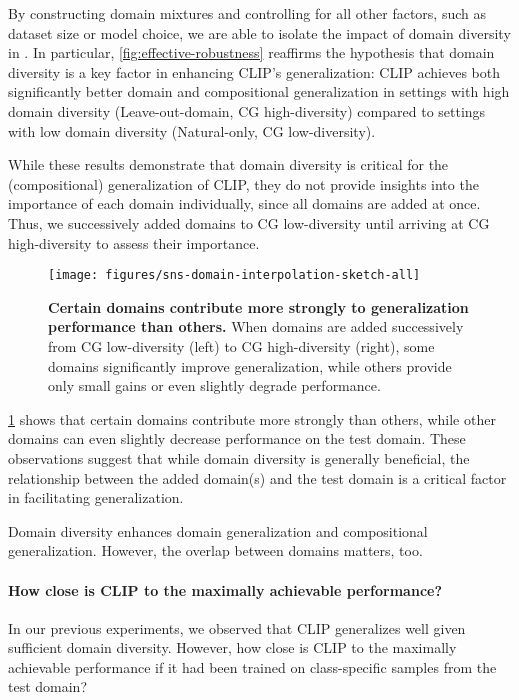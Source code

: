 By constructing domain mixtures and controlling for all other factors, such as dataset size or model choice, we are able to isolate the impact of domain diversity in . In particular, \cref{fig:effective-robustness} reaffirms the hypothesis that domain diversity is a key factor in enhancing CLIP's generalization: CLIP achieves both significantly better domain and compositional generalization in settings with high domain diversity (Leave-out-domain, CG high-diversity) compared to settings with low domain diversity (Natural-only, CG low-diversity).

While these results demonstrate that domain diversity is critical for the (compositional) generalization of CLIP, they do not provide insights into the importance of each domain individually, since all domains are added at once. Thus, we successively added domains to CG low-diversity until arriving at CG high-diversity to assess their importance.

\begin{figure}[t]
    \centering
    \texttt{[image: figures/sns-domain-interpolation-sketch-all]}
    \caption{\textbf{Certain domains contribute more strongly to generalization performance than others.} When domains are added successively from CG low-diversity (left) to CG high-diversity (right), some domains significantly improve generalization, while others provide only small gains or even slightly degrade performance.}
    \label{fig:domain-itp}
\end{figure}
\cref{fig:domain-itp} shows that certain domains contribute more strongly than others, while other domains can even slightly decrease performance on the test domain. These observations suggest that while domain diversity is generally beneficial, the relationship between the added domain(s) and the test domain is a critical factor in facilitating generalization.
\begin{finding}
    Domain diversity enhances domain generalization and compositional generalization. However, the overlap between domains matters, too.
\end{finding}

\paragraph{How close is CLIP to the maximally achievable performance?}
In our previous experiments, we observed that CLIP generalizes well given sufficient domain diversity. However, how close is CLIP to the maximally achievable performance if it had been trained on class-specific samples from the test domain?

